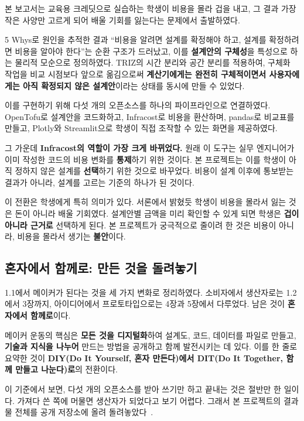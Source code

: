 \documentclass[10pt,a4paper]{article}
\begin{document}
본 보고서는 교육용 크레딧으로 실습하는 학생이 비용을 몰라 겁을 내고, 그 결과 가장 작은 사양만 고르게 되어 배울 기회를 잃는다는 문제에서 출발하였다.

5 Whys로 원인을 추적한 결과 ``비용을 알려면 설계를 확정해야 하고, 설계를 확정하려면 비용을 알아야 한다''는 순환 구조가 드러났고, 이를 \textbf{설계안의 구체성}을 특성으로 하는 물리적 모순으로 정의하였다. TRIZ의 시간 분리와 공간 분리를 적용하여, 구체화 작업을 비교 시점보다 앞으로 옮김으로써 \textbf{계산기에게는 완전히 구체적이면서 사용자에게는 아직 확정되지 않은 설계안}이라는 상태를 동시에 만들 수 있었다.

이를 구현하기 위해 다섯 개의 오픈소스를 하나의 파이프라인으로 연결하였다. OpenTofu로 설계안을 코드화하고, Infracost로 비용을 환산하며, pandas로 비교표를 만들고, Plotly와 Streamlit으로 학생이 직접 조작할 수 있는 화면을 제공하였다.

그 가운데 \textbf{Infracost의 역할이 가장 크게 바뀌었다.} 원래 이 도구는 실무 엔지니어가 이미 작성한 코드의 비용 변화를 \textbf{통제}하기 위한 것이다. 본 프로젝트는 이를 학생이 아직 정하지 않은 설계를 \textbf{선택}하기 위한 것으로 바꾸었다. 비용이 설계 이후에 통보받는 결과가 아니라, 설계를 고르는 기준의 하나가 된 것이다.

이 전환은 학생에게 특히 의미가 있다. 서론에서 밝혔듯 학생이 비용을 몰라서 잃는 것은 돈이 아니라 배울 기회였다. 설계안별 금액을 미리 확인할 수 있게 되면 학생은 \textbf{겁이 아니라 근거로} 선택하게 된다. 본 프로젝트가 궁극적으로 줄이려 한 것은 비용이 아니라, 비용을 몰라서 생기는 \textbf{불안}이다.

\subsection{혼자에서 함께로: 만든 것을 돌려놓기}

1.1에서 메이커가 된다는 것을 세 가지 변화로 정리하였다. 소비자에서 생산자로는 1.2에서 3장까지, 아이디어에서 프로토타입으로는 4장과 5장에서 다루었다. 남은 것이 \textbf{혼자에서 함께로}이다.

메이커 운동의 핵심은 \textbf{모든 것을 디지털화}하여 설계도, 코드, 데이터를 파일로 만들고, \textbf{기술과 지식을 나누어} 만드는 방법을 공개하고 함께 발전시키는 데 있다. 이를 한 줄로 요약한 것이 \textbf{DIY(Do It Yourself, 혼자 만든다)에서 DIT(Do It Together, 함께 만들고 나눈다)로}의 전환이다.

이 기준에서 보면, 다섯 개의 오픈소스를 받아 쓰기만 하고 끝내는 것은 절반만 한 일이다. 가져다 쓴 쪽에 머물면 생산자가 되었다고 보기 어렵다. 그래서 본 프로젝트의 결과물 전체를 공개 저장소에 올려 돌려놓았다~\cite{costcompass}.
\end{document}
